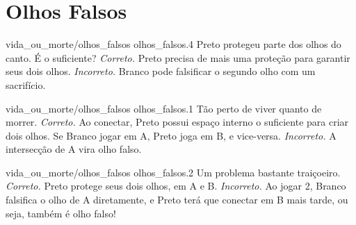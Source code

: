 \chapter{Olhos Falsos}

\emptypage

\problemAnswerDiagram
  {vida_ou_morte/olhos_falsos}
  {olhos_falsos.4}
  {Preto protegeu parte dos olhos do canto. É o suficiente?}
  {\emph{Correto.} Preto precisa de mais uma proteção para garantir seus dois olhos.}
  {\emph{Incorreto.} Branco pode falsificar o segundo olho com um sacrifício.}

\problemAnswerDiagram
  {vida_ou_morte/olhos_falsos}
  {olhos_falsos.1}
  {Tão perto de viver quanto de morrer.}
  {\emph{Correto.} Ao conectar, Preto possui espaço interno o suficiente para criar dois olhos. Se Branco jogar em A, Preto joga em B, e vice-versa.}
  {\emph{Incorreto.} A intersecção de A vira olho falso.}

\problemAnswerDiagram
  {vida_ou_morte/olhos_falsos}
  {olhos_falsos.2}
  {Um problema bastante traiçoeiro.}
  {\emph{Correto.} Preto protege seus dois olhos, em A e B.}
  {\emph{Incorreto.} Ao jogar 2, Branco falsifica o olho de A diretamente, e Preto terá que conectar em B mais tarde, ou seja, também é olho falso!}